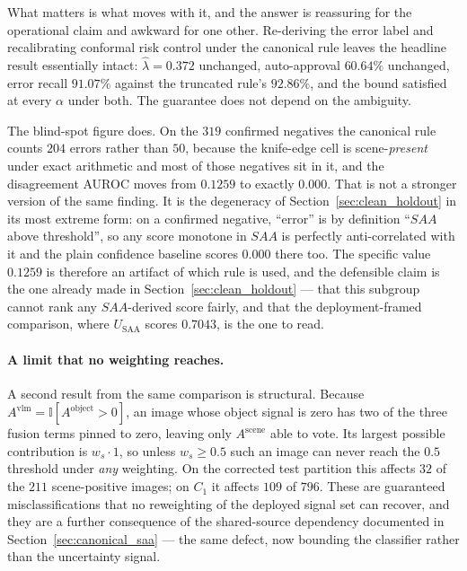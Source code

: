 \documentclass[12pt,a4paper]{report}
\begin{document}
What matters is what moves with it, and the answer is reassuring for the operational claim and
awkward for one other. Re-deriving the error label and recalibrating conformal risk control under
the canonical rule leaves the headline result essentially intact: $\hat\lambda = 0.372$ unchanged,
auto-approval $60.64\%$ unchanged, error recall $91.07\%$ against the truncated rule's $92.86\%$,
and the bound satisfied at every $\alpha$ under both. The guarantee does not depend on the
ambiguity.

The blind-spot figure does. On the $319$ confirmed negatives the canonical rule counts $204$
errors rather than $50$, because the knife-edge cell is scene-\emph{present} under exact
arithmetic and most of those negatives sit in it, and the disagreement AUROC moves from $0.1259$
to exactly $\mathbf{0.000}$. That is not a stronger version of the same finding. It is the
degeneracy of Section~\ref{sec:clean_holdout} in its most extreme form: on a confirmed negative,
``error'' is by definition ``$SAA$ above threshold'', so any score monotone in $SAA$ is perfectly
anti-correlated with it and the plain confidence baseline scores $0.000$ there too. The specific
value $0.1259$ is therefore an artifact of which rule is used, and the defensible claim is the one
already made in Section~\ref{sec:clean_holdout} --- that this subgroup cannot rank any
$SAA$-derived score fairly, and that the deployment-framed comparison, where $U_{\text{SAA}}$
scores $0.7043$, is the one to read.

\paragraph{A limit that no weighting reaches.} A second result from the same comparison is
structural. Because $A^{\text{vlm}} = \mathbb{I}[A^{\text{object}} > 0]$, an image whose object
signal is zero has two of the three fusion terms pinned to zero, leaving only $A^{\text{scene}}$
able to vote. Its largest possible contribution is $w_s \cdot 1$, so unless $w_s \ge 0.5$ such an
image can never reach the $0.5$ threshold under \emph{any} weighting. On the corrected test
partition this affects $32$ of the $211$ scene-positive images; on $C_1$ it affects $109$ of
$796$. These are guaranteed misclassifications that no reweighting of the deployed signal set can
recover, and they are a further consequence of the shared-source dependency documented in
Section~\ref{sec:canonical_saa} --- the same defect, now bounding the classifier rather than the
uncertainty signal.
\end{document}
